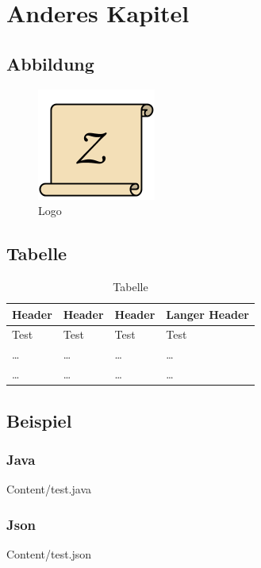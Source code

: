\chapter{Anderes Kapitel}
	\section{Abbildung}
        \begin{figure}[H]
			\centering
			\includegraphics[scale=0.5]{Content/Logo}
			\caption{Logo}
			\label{fig:logo}
		\end{figure} \noindent
	\section{Tabelle}
		\begin{table}[H]
			\begin{tabular}{| p{3cm} | p{3cm} | p{3cm} | p{5cm} |}
			\hline
			\textbf{Header} 				&		\textbf{Header}				&			\textbf{Header}		&		\textbf{Langer Header}			
			\\ \hline
			Test									&			Test								&			Test							&		Test		
			\\ \hdashline
			\dots								&			\dots							&			\dots						&			\dots
			\\ \hline
			\dots								&			\dots							&			\dots						&			\dots
			\\ \hline
			\end{tabular}
			\caption{Tabelle}
		\end{table}
	\section{Beispiel}
		\subsection{Java}
			
	                 	{Content/test.java}
		\subsection{Json}
			
	                 	{Content/test.json}

